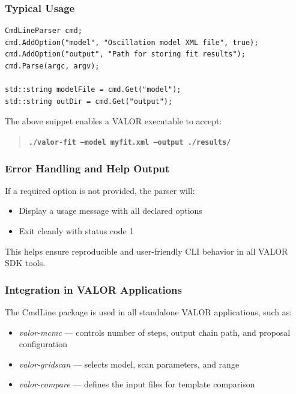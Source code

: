 \vspace{1em}
\subsubsection*{\color{cadmiumgreen} \bf Typical Usage}

\begin{lstlisting}
CmdLineParser cmd;
cmd.AddOption("model", "Oscillation model XML file", true);
cmd.AddOption("output", "Path for storing fit results");
cmd.Parse(argc, argv);

std::string modelFile = cmd.Get("model");
std::string outDir = cmd.Get("output");
\end{lstlisting}

The above snippet enables a VALOR executable to accept:

\begin{quote}
{\bf \tt ./valor-fit --model myfit.xml --output ./results/}
\end{quote}

\vspace{1em}
\subsubsection*{Error Handling and Help Output}

If a required option is not provided, the parser will:

\begin{itemize}
  \item Display a usage message with all declared options
  \item Exit cleanly with status code {\color{amber}1}
\end{itemize}

This helps ensure reproducible and user-friendly CLI behavior in all VALOR SDK tools.

\vspace{1em}
\subsubsection*{Integration in VALOR Applications}

The {\color{cadmiumgreen} CmdLine} package is used in all standalone VALOR applications, such as:

\begin{itemize}
  \item {\it valor-mcmc} — controls number of steps, output chain path, and proposal configuration
  \item {\it valor-gridscan} — selects model, scan parameters, and range
  \item {\it valor-compare} — defines the input files for template comparison
\end{itemize}

